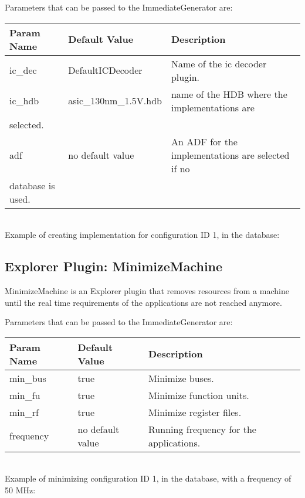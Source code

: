 \documentclass[twoside]{tceusermanual}
\begin{document}
Parameters that can be passed to the ImmediateGenerator are:

\begin{tabular}{p{}p{}
                p{}}
\textbf{Param Name} &\textbf{Default Value} &\textbf{Description} \\
\hline
ic\_dec & DefaultICDecoder & Name of the ic decoder plugin. \\
ic\_hdb & asic\_130nm\_1.5V.hdb & name of the HDB where the implementations are \\
selected. \\
adf & no default value & An ADF for the implementations are selected if no \\
database is used. \\
\end{tabular}\\

Example of creating implementation for configuration ID 1, in the database:


\subsection{Explorer Plugin: MinimizeMachine}
MinimizeMachine is an Explorer plugin that removes resources from a machine
until the real time requirements of the applications are not reached anymore.

Parameters that can be passed to the ImmediateGenerator are:

\begin{tabular}{p{}p{}
                p{}}
\textbf{Param Name} &\textbf{Default Value} &\textbf{Description} \\
\hline
min\_bus & true & Minimize buses. \\
min\_fu & true & Minimize function units. \\
min\_rf & true & Minimize register files. \\
frequency & no default value & Running frequency for the applications. \\
\end{tabular}\\

Example of minimizing configuration ID 1, in the database, with a frequency
of 50 MHz:

\end{document}
